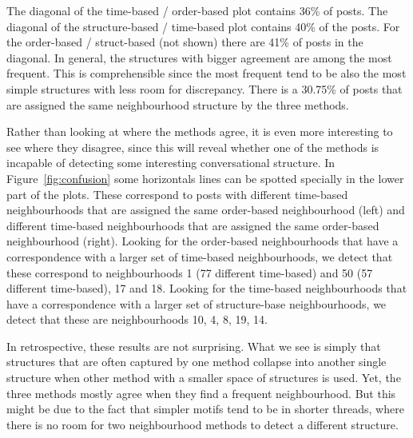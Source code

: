 \documentclass[conference]{IEEEtran}
\begin{document}
The diagonal of the time-based / order-based plot contains 36\% of posts. The diagonal of the structure-based / time-based plot contains 40\% of the posts. For the order-based / struct-based (not shown) there are 41\% of posts in the diagonal. In general, the structures with bigger agreement are among the most frequent. This is comprehensible since the most frequent tend to be also the most simple structures with less room for discrepancy. There is a 30.75\% of posts that are assigned the same neighbourhood structure by the three methods. 

Rather than looking at where the methods agree, it is even more interesting to see where they disagree, since this will reveal whether one of the methods is incapable of detecting some interesting conversational structure. In Figure~\ref{fig:confusion} some horizontals lines can be spotted specially in the lower part of the plots. These correspond to posts with different time-based neighbourhoods that are assigned the same order-based neighbourhood (left) and different time-based neighbourhoods that are assigned the same order-based neighbourhood (right). Looking for the order-based neighbourhoods that have a correspondence with a larger set of time-based neighbourhoods, we detect that these correspond to neighbourhoods 1 (77 different time-based) and 50 (57 different time-based), 17 and 18. Looking for the time-based neighbourhoods that have a correspondence with a larger set of structure-base neighbourhoods, we detect that these are neighbourhoods 10, 4, 8, 19, 14.

In retrospective, these results are not surprising. What we see is simply that structures that are often captured by one method collapse into another single structure when other method with a smaller space of structures is used. Yet, the three methods mostly agree when they find a frequent neighbourhood. But this might be due to the fact that simpler motifs tend to be in shorter threads, where there is no room for two neighbourhood methods to detect a different structure.
\end{document}
